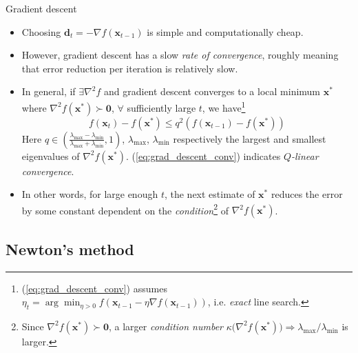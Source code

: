 \documentclass{beamer}
\numberwithin{equation}{section}
\newcommand{\aref}[1]{\alert{\ref{#1}}}
\begin{document}
\begin{frame}{Gradient descent}
    \begin{itemize}
        \item
        Choosing $ \mathbf{d}_t = -\nabla f(\mathbf{x}_{t - 1}) $ is simple
        and computationally cheap.

        \item
        However, gradient descent has a slow \textit{rate of convergence},
        roughly meaning that error reduction per iteration is relatively slow.

        \item
        In general, if $ \exists \nabla^2f $ and gradient descent converges to
        a local minimum $ \mathbf{x}^* $ where $ \nabla^2f(\mathbf{x}^*) \succ
        \mathbf{0} $, $ \forall $ sufficiently large $ t $, we have\footnote{
            (\aref{eq:grad_descent_conv}) assumes
            $ \eta_t = \arg\min_{\eta > 0}f(\mathbf{x}_{t - 1} - \eta
            \nabla f(\mathbf{x}_{t - 1})) $, i.e. \textit{exact} line search.
        }
        \cite{nocedal_opt}
        \begin{equation} \label{eq:grad_descent_conv}
            f(\mathbf{x}_t) - f(\mathbf{x}^*) \le q^2(f(\mathbf{x}_{t - 1}) -
            f(\mathbf{x}^*))
        \end{equation}
        Here $ q \in \left(\frac{\lambda_{\max} -
        \lambda_{\min}}{\lambda_{\max} + \lambda_{\min}}, 1\right) $,
        $ \lambda_{\max} $, $ \lambda_{\min} $ respectively the largest and
        smallest eigenvalues of $ \nabla^2f(\mathbf{x}^*) $. 
        (\aref{eq:grad_descent_conv}) indicates
        $ Q $\textit{-linear convergence}.

        \item
        In other words, for large enough $ t $, the next estimate of
        $ \mathbf{x}^* $ reduces the error by some constant dependent on the
        \textit{condition}\footnote{
            Since $ \nabla^2f(\mathbf{x}^*) \succ \mathbf{0} $, a larger
            \textit{condition number} $ \kappa\big(\nabla^2f(\mathbf{x}^*)\big)
            \Rightarrow \lambda_{\max} / \lambda_{\min} $ is larger.
        } of $ \nabla^2 f(\mathbf{x}^*) $.
    \end{itemize}

    \medskip
\end{frame}

\subsection{Newton's method}
\end{document}
